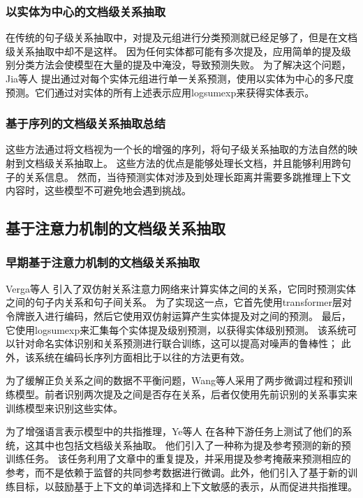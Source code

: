 \documentclass[bachelor]{thesis-uestc}
\begin{document}
\subsubsection{以实体为中心的文档级关系抽取}
在传统的句子级关系抽取中，对提及元组进行分类预测就已经足够了，但是在文档级关系抽取中却不是这样。
因为任何实体都可能有多次提及，应用简单的提及级别分类方法会使模型在大量的提及中淹没，导致预测失败。
为了解决这个问题，Jia等人 \cite{jia-etal-2019-document} 提出通过对每个实体元组进行单一关系预测，使用以实体为中心的多尺度预测。它们通过对实体的所有上述表示应用logsumexp来获得实体表示。

\subsubsection{基于序列的文档级关系抽取总结}
这些方法通过将文档视为一个长的增强的序列，将句子级关系抽取的方法自然的映射到文档级关系抽取上。
这些方法的优点是能够处理长文档，并且能够利用跨句子的关系信息。
然而，当待预测实体对涉及到处理长距离并需要多跳推理上下文内容时，这些模型不可避免地会遇到挑战。

\subsection{基于注意力机制的文档级关系抽取}

\subsubsection{早期基于注意力机制的文档级关系抽取}
Verga等人\cite{verga-etal-2018-simultaneously} 引入了双仿射关系注意力网络来计算实体之间的关系，它同时预测实体之间的句子内关系和句子间关系。
为了实现这一点，它首先使用transformer层对令牌嵌入进行编码，然后它使用双仿射运算产生实体提及对之间的预测。
最后，它使用logsumexp来汇集每个实体提及级别预测，以获得实体级别预测。
该系统可以针对命名实体识别和关系预测进行联合训练，这可以提高对噪声的鲁棒性； 此外，该系统在编码长序列方面相比于以往的方法更有效。\par

为了缓解正负关系之间的数据不平衡问题，Wang等人采用了两步微调过程和预训练模型。前者识别两次提及之间是否存在关系，后者仅使用先前识别的关系事实来训练模型来识别这些实体。\par
为了增强语言表示模型中的共指推理，Ye等人 \cite{y2020-coreferential}在各种下游任务上测试了他们的系统，这其中也包括文档级关系抽取。
他们引入了一种称为提及参考预测的新的预训练任务。
该任务利用了文章中的重复提及，并采用提及参考掩蔽来预测相应的参考，而不是依赖于监督的共同参考数据进行微调。此外，他们引入了基于新的训练目标，以鼓励基于上下文的单词选择和上下文敏感的表示，从而促进共指推理。
\end{document}
